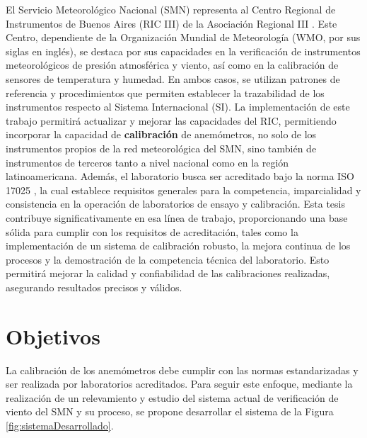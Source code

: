 El Servicio Meteorológico Nacional (SMN) representa al Centro Regional de Instrumentos de Buenos Aires (RIC III) de la Asociación Regional III \cite{RIC_Argentina}. Este Centro, dependiente de la Organización Mundial de Meteorología (WMO, por sus siglas en inglés), se destaca por sus capacidades en la verificación de instrumentos meteorológicos de presión atmosférica y viento, así como en la calibración de sensores de temperatura y humedad. En ambos casos, se utilizan patrones de referencia y procedimientos que permiten establecer la trazabilidad de los instrumentos respecto al Sistema Internacional (SI). La implementación de este trabajo permitirá actualizar y mejorar las capacidades del RIC, permitiendo incorporar la capacidad de \textbf{calibración} de anemómetros, no solo de los instrumentos propios de la red meteorológica del SMN, sino también de instrumentos de terceros tanto a nivel nacional como en la región latinoamericana.  Además, el laboratorio busca ser acreditado bajo la norma ISO 17025 \cite{ISO17025}, la cual establece requisitos generales para la competencia, imparcialidad y consistencia en la operación de laboratorios de ensayo y calibración. Esta tesis contribuye significativamente en esa línea de trabajo, proporcionando una base sólida para cumplir con los requisitos de acreditación, tales como la implementación de un sistema de calibración robusto, la mejora continua de los procesos y la demostración de la competencia técnica del laboratorio. Esto permitirá mejorar la calidad y confiabilidad de las calibraciones realizadas, asegurando resultados precisos y válidos.

\section{Objetivos}\label{sec:objetivos}

La calibración de los anemómetros debe cumplir con las normas estandarizadas  \cite{ISO16622} \cite{ISO17713-1} \cite{IEC61400-12-1} y ser realizada por laboratorios acreditados. Para seguir este enfoque, mediante la realización de un relevamiento y estudio del sistema actual de verificación de viento del SMN y su proceso, se propone desarrollar el sistema de la Figura \ref{fig:sistemaDesarrollado}.

